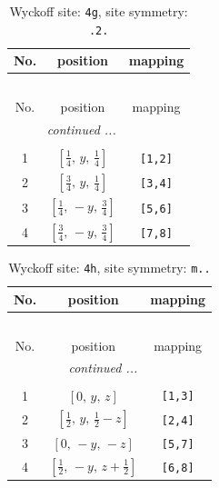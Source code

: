 \documentclass[fleqn,8pt]{jsarticle}
\begin{document}
\renewcommand{\arraystretch}{1.2}
\begin{longtable}{ccc}
\caption{Wyckoff site: {\tt 4g}, site symmetry: {\tt .2.}}
 \\
 \hline \hline
No. & position & mapping \\ \hline \endfirsthead

\multicolumn{2}{l}{\tablename\ \thetable{}} \\
 \hline \hline
No. & position & mapping \\ \hline \endhead

 \hline \hline
\multicolumn{2}{r}{\footnotesize\it continued ...} \\ \endfoot

 \hline \hline
\multicolumn{2}{r}{} \\ \endlastfoot

1 & $\left[ \frac{1}{4},\, y,\, \frac{1}{4} \right]$ & {\tt [1,2]} \\ \hline
2 & $\left[ \frac{3}{4},\, y,\, \frac{1}{4} \right]$ & {\tt [3,4]} \\ \hline
3 & $\left[ \frac{1}{4},\, - y,\, \frac{3}{4} \right]$ & {\tt [5,6]} \\ \hline
4 & $\left[ \frac{3}{4},\, - y,\, \frac{3}{4} \right]$ & {\tt [7,8]} \\
\end{longtable}
\renewcommand{\arraystretch}{1.2}
\begin{longtable}{ccc}
\caption{Wyckoff site: {\tt 4h}, site symmetry: {\tt m..}}
 \\
 \hline \hline
No. & position & mapping \\ \hline \endfirsthead

\multicolumn{2}{l}{\tablename\ \thetable{}} \\
 \hline \hline
No. & position & mapping \\ \hline \endhead

 \hline \hline
\multicolumn{2}{r}{\footnotesize\it continued ...} \\ \endfoot

 \hline \hline
\multicolumn{2}{r}{} \\ \endlastfoot

1 & $\left[ 0,\, y,\, z \right]$ & {\tt [1,3]} \\ \hline
2 & $\left[ \frac{1}{2},\, y,\, \frac{1}{2} - z \right]$ & {\tt [2,4]} \\ \hline
3 & $\left[ 0,\, - y,\, - z \right]$ & {\tt [5,7]} \\ \hline
4 & $\left[ \frac{1}{2},\, - y,\, z + \frac{1}{2} \right]$ & {\tt [6,8]} \\
\end{longtable}
\end{document}
